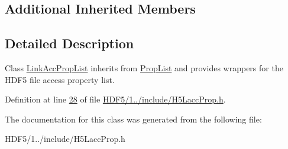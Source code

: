 \subsection*{Additional Inherited Members}


\subsection{Detailed Description}
Class \hyperlink{class_h5_1_1_link_acc_prop_list}{Link\+Acc\+Prop\+List} inherits from \hyperlink{class_h5_1_1_prop_list}{Prop\+List} and provides wrappers for the H\+D\+F5 file access property list. 

Definition at line \hyperlink{_h_d_f5_21_810_81_2include_2_h5_lacc_prop_8h_source_l00028}{28} of file \hyperlink{_h_d_f5_21_810_81_2include_2_h5_lacc_prop_8h_source}{H\+D\+F5/1../include/\+H5\+Lacc\+Prop.\+h}.



The documentation for this class was generated from the following file\+:\begin{DoxyCompactItemize}
\item 
H\+D\+F5/1../include/\+H5\+Lacc\+Prop.\+h\end{DoxyCompactItemize}
